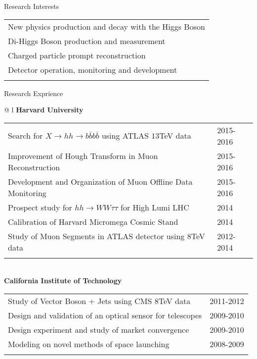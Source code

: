 \documentclass[letterpaper,11pt,oneside]{article}
\begin{document}
 \raggedright
 \Large{Research Interests} \\
 \normalsize
 \begin{flushleft}
\hspace{1cm}
 \begin{tabular}{@{} l}
     New physics production and decay with the Higgs Boson\\
     Di-Higgs Boson production and measurement \\
     Charged particle prompt reconstruction \\
     Detector operation, monitoring and development\\
     \\
      \end{tabular}
\end{flushleft}

 \raggedright
 \Large{Research Exprience} \\
 \normalsize
\begin{flushleft}
\hspace{1cm}
 \begin{tabular}{@{} l}
    \textbf{Harvard University} \\ 
    \begin{tabular}{@{} l l }
 Search for $X \to hh \to b\bar{b}b\bar{b}$ using ATLAS $13$TeV data & 2015-2016\\
 Improvement of Hough Transform in Muon Reconstruction & 2015-2016\\
 Development and Organization of Muon Offline Data Monitoring & 2015-2016\\
 Prospect study for $hh \to WW\tau\tau$ for High Lumi LHC & 2014\\
 Calibration of Harvard Micromega Cosmic Stand & 2014\\
 Study of Muon Segments in ATLAS detector using $8$TeV data & 2012-2014\\
    \hspace{0.7\linewidth} & \hspace{0.1\linewidth} \\
     \end{tabular}
     \\
     \textbf{California Institute of Technology} \\
     \begin{tabular}{@{} l l }
 Study of Vector Boson + Jets using CMS $8$TeV data&2011-2012\\
 Design and validation of an optical sensor for telescopes&2009-2010\\
 Design experiment and study of market convergence &2009-2010\\
 Modeling on novel methods of space launching&2008-2009\\
    \hspace{0.7\linewidth} & \hspace{0.1\linewidth} \\
      \end{tabular}
      \end{tabular}
\end{flushleft}
\newpage
\end{document}
